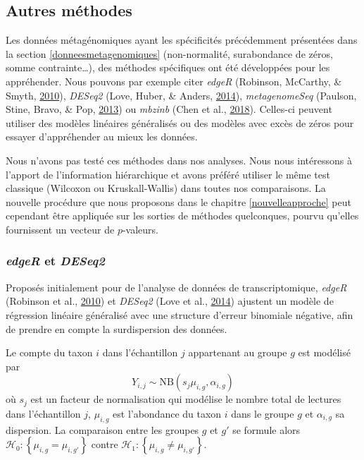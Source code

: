 \documentclass[12pt,a4paper]{reedthesis}
\theoremstyle{definition}
\theoremstyle{definition}
\theoremstyle{definition}
\theoremstyle{remark}
\begin{document}
\hypertarget{autres-methodes}{%
\subsection{Autres méthodes}\label{autres-methodes}}

Les données métagénomiques ayant les spécificités précédemment présentées dans la section \ref{donneesmetagenomiques} (non-normalité, surabondance de zéros, somme contrainte\ldots), des méthodes spécifiques ont été développées pour les appréhender. Nous pouvons par exemple citer \emph{edgeR} (Robinson, McCarthy, \& Smyth, \protect\hyperlink{ref-robinson2010edger}{2010}), \emph{DESeq2} (Love, Huber, \& Anders, \protect\hyperlink{ref-love2014moderated}{2014}), \emph{metagenomeSeq} (Paulson, Stine, Bravo, \& Pop, \protect\hyperlink{ref-paulson2013differential}{2013}) ou \emph{mbzinb} (Chen et al., \protect\hyperlink{ref-chen2018omnibus}{2018}). Celles-ci peuvent utiliser des modèles linéaires généralisés ou des modèles avec excès de zéros pour essayer d'appréhender au mieux les données.

Nous n'avons pas testé ces méthodes dans nos analyses. Nous nous intéressons à l'apport de l'information hiérarchique et avons préféré utiliser le même test classique (Wilcoxon ou Kruskall-Wallis) dans toutes nos comparaisons. La nouvelle procédure que nous proposons dans le chapitre \ref{nouvelleapproche} peut cependant être appliquée sur les sorties de méthodes quelconques, pourvu qu'elles fournissent un vecteur de \(p\)-valeurs.

\hypertarget{edger-et-deseq2}{%
\subsubsection*{\texorpdfstring{\emph{edgeR} et \emph{DESeq2}}{edgeR et DESeq2}}\label{edger-et-deseq2}}

Proposés initialement pour de l'analyse de données de transcriptomique, \emph{edgeR} (Robinson et al., \protect\hyperlink{ref-robinson2010edger}{2010}) et \emph{DESeq2} (Love et al., \protect\hyperlink{ref-love2014moderated}{2014}) ajustent un modèle de régression linéaire généralisé avec une structure d'erreur binomiale négative, afin de prendre en compte la surdispersion des données.

Le compte du taxon \(i\) dans l'échantillon \(j\) appartenant au groupe \(g\) est modélisé par
\begin{equation*}
Y_{i,j} \sim \text{NB}\left(s_j \mu_{i,g},\alpha_{i,g}\right)
\end{equation*}
où \(s_j\) est un facteur de normalisation qui modélise le nombre total de lectures dans l'échantillon \(j\), \(\mu_{i,g}\) est l'abondance du taxon \(i\) dans le groupe \(g\) et \(\alpha_{i,g}\) sa dispersion. La comparaison entre les groupes \(g\) et \(g'\) se formule alors \(\mathcal{H}_0 : \left\{\mu_{i,g} = \mu_{i,g'}\right\}\) contre \(\mathcal{H}_1 : \left\{\mu_{i,g} \neq \mu_{i,g'}\right\}\).
\end{document}
